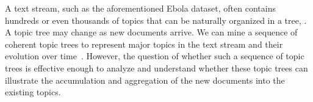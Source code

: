 A text stream, such as the aforementioned Ebola dataset, often contains hundreds or even thousands of topics that can be naturally organized in a tree, .
A topic tree may change as new documents arrive.
We can mine a sequence of coherent topic trees to represent major topics in the text stream and their evolution over time~\cite{Wang2013}.
However, the question of whether such a sequence of topic trees is effective enough to analyze and understand  whether these topic trees can illustrate the accumulation and aggregation of the new documents into the existing topics.



